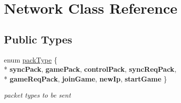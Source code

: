 \hypertarget{class_network}{\section{Network Class Reference}
\label{class_network}
}
\subsection*{Public Types}
\begin{DoxyCompactItemize}
\item 
\hypertarget{class_network_a95cb88240e7c07871d740c2e19b55aab}{enum \hyperlink{class_network_a95cb88240e7c07871d740c2e19b55aab}{pack\+Type} \{ \\*
{\bfseries sync\+Pack}, 
{\bfseries game\+Pack}, 
{\bfseries control\+Pack}, 
{\bfseries sync\+Req\+Pack}, 
\\*
{\bfseries game\+Req\+Pack}, 
{\bfseries join\+Game}, 
{\bfseries new\+Ip}, 
{\bfseries start\+Game}
 \}}\label{class_network_a95cb88240e7c07871d740c2e19b55aab}

\begin{DoxyCompactList}\small\item\em packet types to be sent \end{DoxyCompactList}\end{DoxyCompactItemize}
